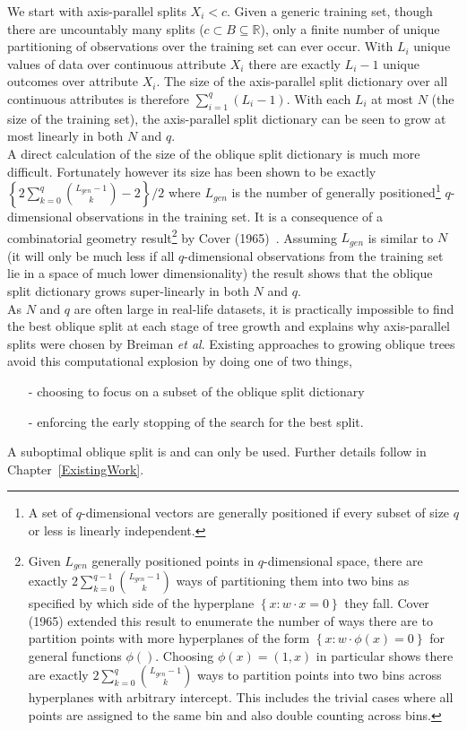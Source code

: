 We start with axis-parallel splits $X_i<c$. Given a generic training set, though there are uncountably many splits ($c\subset B\subseteq\mathbb{R}$), only a finite number of unique partitioning of observations over the training set can ever occur. With $L_i$ unique values of data over continuous attribute $X_i$ there are exactly $L_i-1$ unique outcomes over attribute $X_i$. The size of the axis-parallel split dictionary over all continuous attributes is therefore $\sum_{i=1}^q (L_i-1)$. With each $L_i$ at most $N$ (the size of the training set), the axis-parallel split dictionary can be seen to grow at most linearly in both $N$ and $q$.\\

A direct calculation of the size of the oblique split dictionary is much more difficult. Fortunately however its size has been shown to be exactly $\left\{2\sum_{k=0}^{q} {L_{gen}-1\choose k}-2\right\}/2$ where $L_{gen}$ is the number of generally positioned\footnote{A set of $q$-dimensional vectors are generally positioned if every subset of size $q$ or less is linearly independent.} $q$-dimensional observations in the training set. It is a consequence of a combinatorial geometry result\footnote{Given $L_{gen}$ generally positioned points in $q$-dimensional space, there are exactly $2\sum_{k=0}^{q-1} {L_{gen}-1\choose k}$ ways of partitioning them into two bins as specified by which side of the hyperplane $\left\{x:w\cdot x=0\right\}$ they fall. Cover (1965) extended this result to enumerate the number of ways there are to partition points with more hyperplanes of the form $\left\{x:w\cdot \phi(x)=0\right\}$ for general functions $\phi()$. Choosing $\phi(x)=(1,x)$ in particular shows there are exactly $2\sum_{k=0}^{q} {L_{gen}-1\choose k}$ ways to partition points into two bins across hyperplanes with arbitrary intercept. This includes the trivial cases where all points are assigned to the same bin and also double counting across bins.} by Cover (1965)~\cite{Cover65}. Assuming $L_{gen}$ is similar to $N$ (it will only be much less if all $q$-dimensional observations from the training set lie in a space of much lower dimensionality) the result shows that the oblique split dictionary grows super-linearly in both $N$ and $q$. \\

As $N$ and $q$ are often large in real-life datasets, it is practically impossible to find the best oblique split at each stage of tree growth and explains why axis-parallel splits were chosen by Breiman \emph{et al}. Existing approaches to growing oblique trees avoid this computational explosion by doing one of two things,
\begin{itemize}
\item[-] choosing to focus on a subset of the oblique split dictionary
\item[-] enforcing the early stopping of the search for the best split.
\end{itemize}
A suboptimal oblique split is and can only be used. Further details follow in Chapter~\ref{ExistingWork}.

